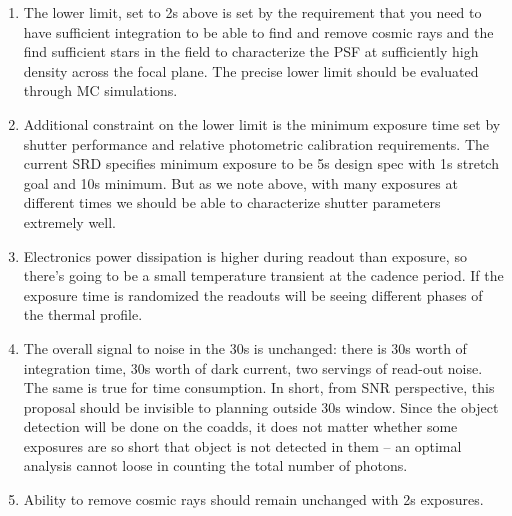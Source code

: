 \documentclass[12pt, a4paper]{article}
\begin{document}
\begin{enumerate}
\item The lower limit, set to 2s above is set by the requirement that
  you need to have sufficient integration to be able to find and
  remove cosmic rays and the find sufficient stars in the field to
  characterize the PSF at sufficiently high density across the focal
  plane. The precise lower limit should be evaluated through MC
  simulations.

\item Additional constraint on the lower limit is the minimum exposure
  time set by shutter performance and relative photometric calibration
  requirements. The current SRD specifies minimum exposure to be 5s
  design spec with 1s stretch goal and 10s minimum. But as we note
  above, with many exposures at different times we should be able to
  characterize shutter parameters extremely well.

\item Electronics power dissipation is higher during readout than
  exposure, so there's going to be a small temperature transient at
  the cadence period. If the exposure time is randomized the readouts
  will be seeing different phases of the thermal profile.

\item The overall signal to noise in the 30s is unchanged: there is
  30s worth of integration time, 30s worth of dark current, two
  servings of read-out noise. The same is true for time
  consumption. In short, from SNR perspective, this proposal should be
  invisible to planning outside 30s window. Since the object detection
  will be done on the coadds, it does not matter whether some
  exposures are so short that object is not detected in them -- an
  optimal analysis cannot loose in counting the total number of photons.

\item Ability to remove cosmic rays should remain unchanged with 2s exposures.
\end{enumerate}
\end{document}
